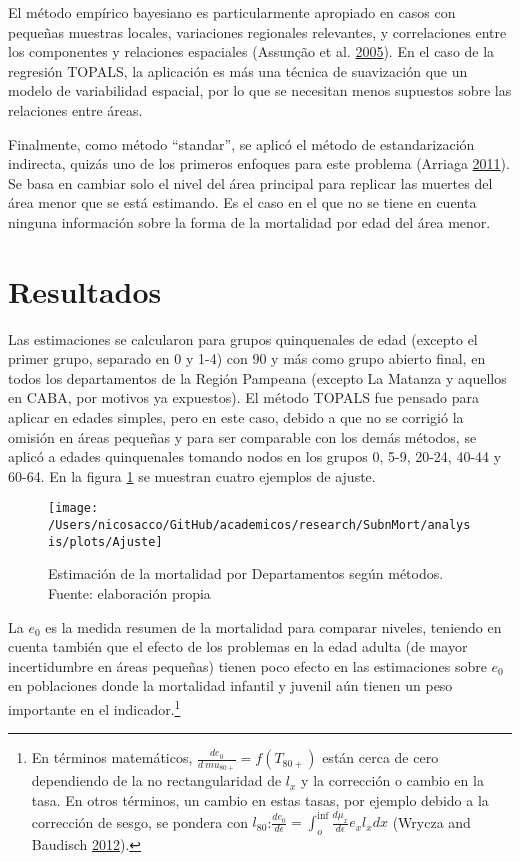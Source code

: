 \documentclass[12pt,]{article}
\begin{document}
El método empírico bayesiano es particularmente apropiado en casos con
pequeñas muestras locales, variaciones regionales relevantes, y
correlaciones entre los componentes y relaciones espaciales (Assunção et
al. \protect\hyperlink{ref-Assuncao2005}{2005}). En el caso de la
regresión TOPALS, la aplicación es más una técnica de suavización que un
modelo de variabilidad espacial, por lo que se necesitan menos supuestos
sobre las relaciones entre áreas.

Finalmente, como método ``standar'', se aplicó el método de
estandarización indirecta, quizás uno de los primeros enfoques para este
problema (Arriaga \protect\hyperlink{ref-Arriaga2011}{2011}). Se basa en
cambiar solo el nivel del área principal para replicar las muertes del
área menor que se está estimando. Es el caso en el que no se tiene en
cuenta ninguna información sobre la forma de la mortalidad por edad del
área menor.

\hypertarget{resultados}{%
\section{Resultados}\label{resultados}}

Las estimaciones se calcularon para grupos quinquenales de edad (excepto
el primer grupo, separado en 0 y 1-4) con 90 y más como grupo abierto
final, en todos los departamentos de la Región Pampeana (excepto La
Matanza y aquellos en CABA, por motivos ya expuestos). El método TOPALS
fue pensado para aplicar en edades simples, pero en este caso, debido a
que no se corrigió la omisión en áreas pequeñas y para ser comparable
con los demás métodos, se aplicó a edades quinquenales tomando nodos en
los grupos 0, 5-9, 20-24, 40-44 y 60-64. En la figura \ref{fig:Ajuste}
se muestran cuatro ejemplos de ajuste.

\begin{figure}

{\centering \texttt{[image: /Users/nicosacco/GitHub/academicos/research/SubnMort/analysis/plots/Ajuste]} 

}

\caption{Estimación de la mortalidad por Departamentos según métodos. Fuente: elaboración propia}\label{fig:Ajuste}
\end{figure}

La \(e_0\) es la medida resumen de la mortalidad para comparar niveles,
teniendo en cuenta también que el efecto de los problemas en la edad
adulta (de mayor incertidumbre en áreas pequeñas) tienen poco efecto en
las estimaciones sobre \(e_0\) en poblaciones donde la mortalidad
infantil y juvenil aún tienen un peso importante en el
indicador.\footnote{En términos matemáticos,
  \(\frac{de_0} {d \ mu_ {80 +}} = f (T_ {80 +})\) están cerca de cero
  dependiendo de la no rectangularidad de \(l_x\) y la corrección o
  cambio en la tasa. En otros términos, un cambio en estas tasas, por
  ejemplo debido a la corrección de sesgo, se pondera con
  \(l_{80}\):\(\frac{de_0} {d \epsilon} = \int_{o}^{\inf}{\frac{d\mu_x} {d \epsilon} e_x l_x dx}\)
  (Wrycza and Baudisch \protect\hyperlink{ref-Wrycza2012}{2012}).}
\end{document}
